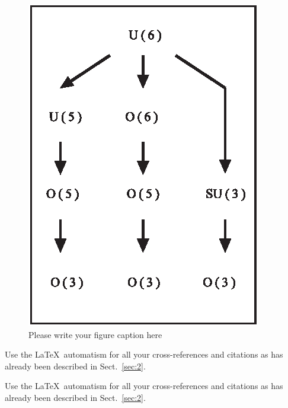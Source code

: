 \documentclass[graybox,envcountchap,sectrefs]{svmono}
\begin{document}
\begin{figure}[t]
	\centering
	\includegraphics[scale=.65]{img/figure}
	\caption{Please write your figure caption here}
	\label{fig:2}       %
\end{figure}

 Use the \LaTeX\ automatism for all your cross-references and citations as has already been described in Sect.~\ref{sec:2}.

 Use the \LaTeX\ automatism for all your cross-refer\-ences and citations as has already been described in Sect.~\ref{sec:2}.
\end{document}
